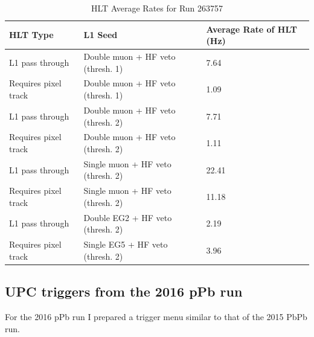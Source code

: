 \begin{table}[h!]
\centering
\caption{HLT Average Rates for Run 263757}
\label{my-label}
\begin{tabular}{@{}lll@{}}
\toprule
HLT Type             & L1 Seed                           & Average Rate of HLT (Hz) \\ \midrule
L1 pass through      & Double muon + HF veto (thresh. 1) & 7.64                     \\
Requires pixel track & Double muon + HF veto (thresh. 1) & 1.09                     \\
L1 pass through      & Double muon + HF veto (thresh. 2) & 7.71                     \\
Requires pixel track & Double muon + HF veto (thresh. 2) & 1.11                     \\
L1 pass through      & Single muon + HF veto (thresh. 2) & 22.41                    \\
Requires pixel track & Single muon + HF veto (thresh. 2) & 11.18                    \\
L1 pass through      & Double EG2 + HF veto (thresh. 2)  & 2.19                     \\
Requires pixel track & Single EG5 + HF veto (thresh. 2)  & 3.96                     \\ \bottomrule
\end{tabular}
\end{table}

\subsection{UPC triggers from the 2016 pPb run}

For the 2016 pPb run I prepared a trigger menu similar to that of the 2015 PbPb run.

